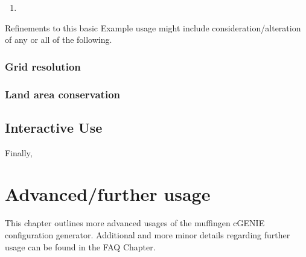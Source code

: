 \documentclass[11pt,fleqn]{book} %
\begin{document}
\begin{enumerate}[noitemsep]
\setlength{\itemindent}{.2in}
\setcounter{enumi}{0}
\item 
\end{enumerate}

Refinements to this basic Example usage might include consideration/alteration of any or all of the following.


\subsection{Grid resolution}



\subsection{Land area conservation}



\section{Interactive Use}

Finally, 





\chapter{Advanced/further usage}

This chapter outlines more advanced usages of the \textsf{muffingen} cGENIE configuration generator. Additional and more minor details regarding further usage can be found in the FAQ Chapter.  

\end{document}
